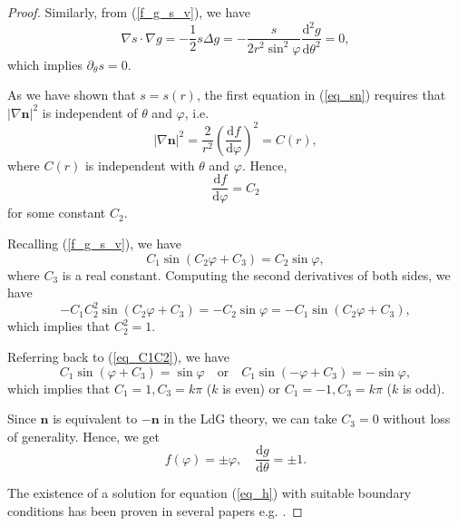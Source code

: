 \documentclass[10pt, a4paper]{article}
\newcommand\dd{\mathrm{d}}
\newcommand\n{\mathbf{n}}
\newcommand\Qvec{\mathbf{Q}}
\newcommand\pp{\partial}
\begin{document}
\begin{proof}
Similarly, from (\ref{f_g_s_v}), we have
\begin{equation}
\nabla s \cdot \nabla g = -\frac{1}{2} s \Delta g =  - \dfrac{s}{2 r^2 \sin^2 \varphi} \dfrac{\dd^2 g}{\dd \theta^2}   = 0,
\end{equation}
which implies $\pp_{\theta} s = 0$.

As we have shown that $s = s(r)$, the first equation in (\ref{eq_sn}) requires that $|\nabla \n|^2$ is independent of $\theta$ and $\varphi$, i.e. 
\begin{equation}
|\nabla \n|^2  = \frac{2}{r^2} \left(\frac{\dd f}{\dd \varphi}\right)^2 = C(r),
\end{equation}
where $C(r)$ is independent with $\theta$ and $\varphi$. Hence, 
\begin{equation}
\frac{\dd f}{\dd \varphi} = C_2
\end{equation}
for some constant $C_2$.

Recalling (\ref{f_g_s_v}), we have
\begin{equation}\label{eq_C1C2}
C_1 \sin (C_2 \varphi + C_3) = C_2 \sin \varphi,
\end{equation}
where $C_3$ is a real constant.
Computing the second derivatives of both sides, we have
\begin{equation}
- C_1 C_2^2 \sin(C_2 \varphi + C_3) = - C_2 \sin \varphi = -C_1 \sin (C_2 \varphi + C_3),
\end{equation}
which implies that $C_2^2 = 1$. %

Referring back to (\ref{eq_C1C2}), we have
\begin{equation}
C_1 \sin (\varphi + C_3) = \sin \varphi \quad \text{or} \quad C_1 \sin (- \varphi + C_3) = - \sin \varphi,
\end{equation}
which implies that $C_1 = 1, C_3 = k \pi$ ($k$ is even) or  $C_1 = - 1, C_3 = k \pi$ ($k$ is odd).

Since $\n$ is equivalent to $- \n$ in the LdG theory, we can take $C_3 = 0$ without loss of generality. Hence, we get 
\begin{equation}\label{C1C2}
f(\varphi) = \pm \varphi, \quad \dfrac{\dd g}{\dd \theta} = \pm 1.
\end{equation}


The existence of a solution for equation (\ref{eq_h}) with suitable boundary conditions has been proven in several papers e.g. \cite{majumdar2012radial, lamy2013some, ignat2014uniqueness}. 
\end{proof}
\end{document}
